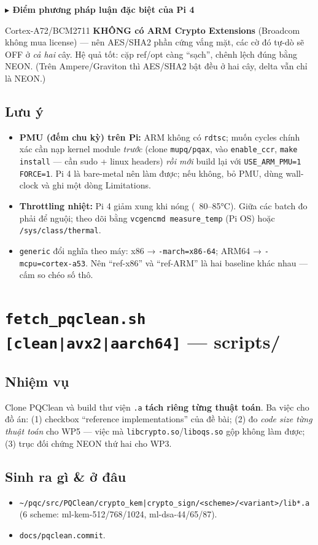 \documentclass[11pt,a4paper]{article}
\newcommand{\tip}[1]{\par\smallskip\noindent\textcolor{accent}{\textbf{\small$\blacktriangleright$ #1}}\par}
\begin{document}
\tip{Điểm phương pháp luận đặc biệt của Pi 4}
Cortex-A72/BCM2711 \textbf{KHÔNG có ARM Crypto Extensions} (Broadcom không mua license) — nên AES/SHA2 phần cứng vắng mặt, các cờ đó tự-dò sẽ OFF ở \emph{cả hai} cây. Hệ quả tốt: cặp ref/opt càng ``sạch'', chênh lệch đúng bằng NEON. (Trên Ampere/Graviton thì AES/SHA2 bật đều ở hai cây, delta vẫn chỉ là NEON.)

\subsection*{Lưu ý}
\begin{itemize}
  \item \textbf{PMU (đếm chu kỳ) trên Pi:} ARM không có \verb|rdtsc|; muốn cycles chính xác cần nạp kernel module \emph{trước} (clone \verb|mupq/pqax|, vào \verb|enable_ccr|, \verb|make install| — cần sudo + linux headers) \emph{rồi mới} build lại với \texttt{USE\_ARM\_PMU=1 FORCE=1}. Pi 4 là bare-metal nên làm được; nếu không, bỏ PMU, dùng wall-clock và ghi một dòng Limitations.
  \item \textbf{Throttling nhiệt:} Pi 4 giảm xung khi nóng (~80–85°C). Giữa các batch đo phải để nguội; theo dõi bằng \verb|vcgencmd measure_temp| (Pi OS) hoặc \verb|/sys/class/thermal|.
  \item \verb|generic| đổi nghĩa theo máy: x86 → \verb|-march=x86-64|; ARM64 → \verb|-mcpu=cortex-a53|. Nên ``ref-x86'' và ``ref-ARM'' là hai baseline khác nhau — cấm so chéo số thô.
\end{itemize}

\section{\texttt{fetch\_pqclean.sh [clean|avx2|aarch64]} — \textmd{\normalsize scripts/}}

\subsection*{Nhiệm vụ}
Clone PQClean và build thư viện \verb|.a| \textbf{tách riêng từng thuật toán}. Ba việc cho đồ án: (1) checkbox ``reference implementations'' của đề bài; (2) đo \emph{code size từng thuật toán} cho WP5 — việc mà \verb|libcrypto.so|/\verb|liboqs.so| gộp không làm được; (3) trục đối chứng NEON thứ hai cho WP3.

\subsection*{Sinh ra gì \& ở đâu}
\begin{itemize}
  \item \verb!~/pqc/src/PQClean/crypto_kem|crypto_sign/<scheme>/<variant>/lib*.a! (6 scheme: ml-kem-512/768/1024, ml-dsa-44/65/87).
  \item \verb|docs/pqclean.commit|.
\end{itemize}
\end{document}
